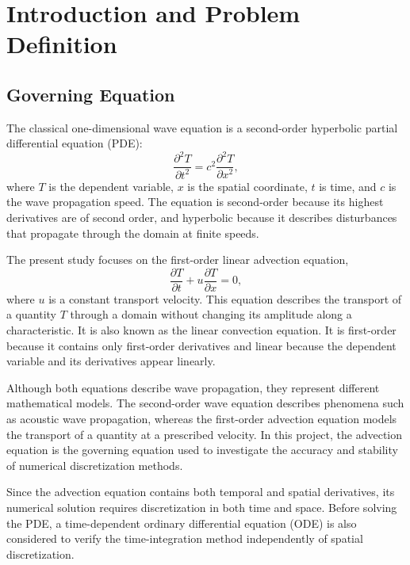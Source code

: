 \section{Introduction and Problem Definition}

\subsection{Governing Equation}
\label{subsec:governing_equation}

The classical one-dimensional wave equation is a second-order hyperbolic partial differential equation (PDE):
\begin{equation}
    \frac{\partial^2 T}{\partial t^2}
    = c^2\frac{\partial^2 T}{\partial x^2},
    \label{eq:classical_wave}
\end{equation}
where $T$ is the dependent variable, $x$ is the spatial coordinate, $t$ is time, and $c$ is the wave propagation speed. The equation is second-order because its highest derivatives are of second order, and hyperbolic because it describes disturbances that propagate through the domain at finite speeds.

The present study focuses on the first-order linear advection equation,
\begin{equation}
    \frac{\partial T}{\partial t}
    + u\frac{\partial T}{\partial x} = 0,
    \label{eq:advection}
\end{equation}
where $u$ is a constant transport velocity. This equation describes the transport of a quantity $T$ through a domain without changing its amplitude along a characteristic. It is also known as the linear convection equation. It is first-order because it contains only first-order derivatives and linear because the dependent variable and its derivatives appear linearly.

Although both equations describe wave propagation, they represent different mathematical models. The second-order wave equation describes phenomena such as acoustic wave propagation, whereas the first-order advection equation models the transport of a quantity at a prescribed velocity. In this project, the advection equation is the governing equation used to investigate the accuracy and stability of numerical discretization methods.

Since the advection equation contains both temporal and spatial derivatives, its numerical solution requires discretization in both time and space. Before solving the PDE, a time-dependent ordinary differential equation (ODE) is also considered to verify the time-integration method independently of spatial discretization.

